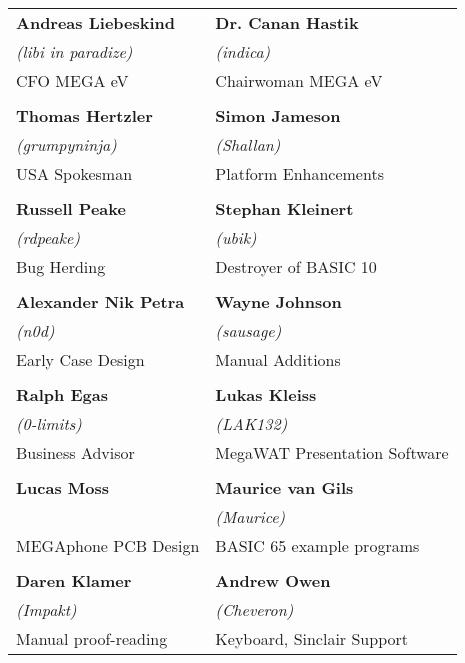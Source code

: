 \begin{tabular}{p{6cm}p{6cm}}

{\large\bf Andreas Liebeskind}     & {\large\bf Dr. Canan Hastik} \\
 \textit{(libi in paradize)}       & \textit{(indica)} \\
CFO MEGA eV                        & Chairwoman MEGA eV \\
& \\
{\large\bf Thomas Hertzler}        & {\large\bf Simon Jameson} \\
 \textit{(grumpyninja)}            &  \textit{(Shallan)} \\
USA Spokesman                      & Platform Enhancements \\
& \\
{\large\bf Russell Peake}          & {\large\bf Stephan Kleinert} \\
  \textit{(rdpeake)}               & \textit{(ubik)}        \\
Bug Herding                        & Destroyer of BASIC 10     \\
& \\
{\large\bf Alexander Nik Petra}    & {\large\bf Wayne Johnson} \\
 \textit{(n0d)}                    &  \textit{(sausage)} \\
Early Case Design                  & Manual Additions \\
& \\
{\large\bf Ralph Egas}             & {\large\bf Lukas Kleiss} \\
 \textit{(0-limits)}               & \textit{(LAK132)} \\
Business Advisor                   & MegaWAT Presentation Software \\
& \\
{\large\bf Lucas Moss}             & {\large\bf Maurice van Gils }  \\
                                   & \textit{(Maurice)}  \\
MEGAphone PCB Design               & BASIC 65 example programs \\
& \\
{\large\bf Daren Klamer}           & {\large\bf Andrew Owen}  \\
 \textit{(Impakt)}                 & \textit{(Cheveron)} \\
Manual proof-reading               & Keyboard, Sinclair Support\\
\end{tabular}

